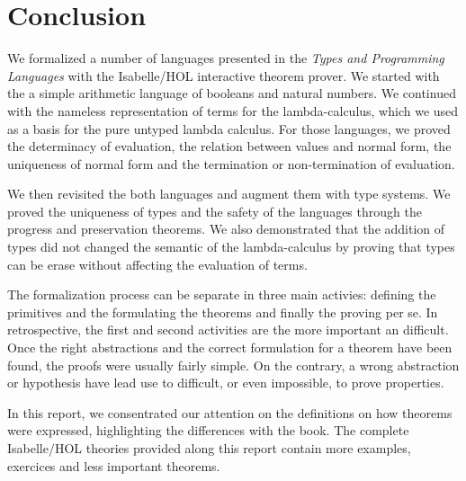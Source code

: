 \section{Conclusion}

We formalized a number of languages presented in the \emph{Types and Programming Languages} with the
Isabelle/HOL interactive theorem prover. We started with the a simple arithmetic language of
booleans and natural numbers. We continued with the nameless representation of terms for the
lambda-calculus, which we used as a basis for the pure untyped lambda calculus. For those languages,
we proved the determinacy of evaluation, the relation between values and normal form, the uniqueness
of normal form and the termination or non-termination of evaluation.

We then revisited the both languages and augment them with type systems. We proved the uniqueness of
types and the safety of the languages through the progress and preservation theorems. We also
demonstrated that the addition of types did not changed the semantic of the lambda-calculus by
proving that types can be erase without affecting the evaluation of terms.

The formalization process can be separate in three main activies: defining the primitives and the
formulating the theorems and finally the proving per se. In retrospective, the first and second
activities are the more important an difficult. Once the right abstractions and the correct
formulation for a theorem have been found, the proofs were usually fairly simple. On the contrary, a
wrong abstraction or hypothesis have lead use to difficult, or even impossible, to prove properties.

In this report, we consentrated our attention on the definitions on how theorems were expressed,
highlighting the differences with the book. The complete Isabelle/HOL theories provided along this
report contain more examples, exercices and less important theorems.
